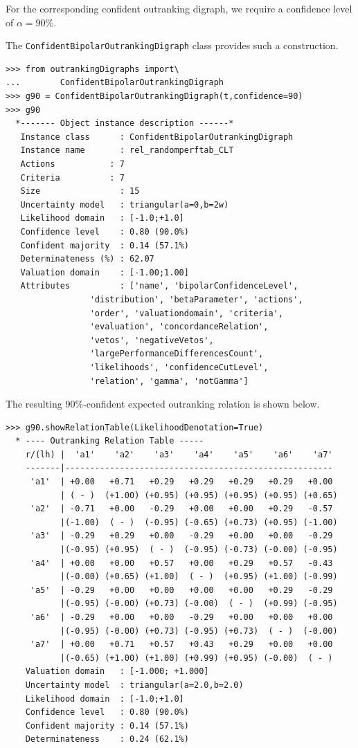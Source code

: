 For the corresponding confident outranking digraph, we require a confidence level of $\alpha = 90\%$.

The \texttt{ConfidentBipolarOutrankingDigraph} class provides such a construction.
\begin{lstlisting}
>>> from outrankingDigraphs import\
...        ConfidentBipolarOutrankingDigraph   
>>> g90 = ConfidentBipolarOutrankingDigraph(t,confidence=90)
>>> g90
  *------- Object instance description ------*
   Instance class      : ConfidentBipolarOutrankingDigraph
   Instance name       : rel_randomperftab_CLT
   Actions           : 7
   Criteria          : 7
   Size                : 15
   Uncertainty model   : triangular(a=0,b=2w)
   Likelihood domain   : [-1.0;+1.0]
   Confidence level    : 0.80 (90.0%)
   Confident majority  : 0.14 (57.1%)
   Determinateness (%) : 62.07
   Valuation domain    : [-1.00;1.00]
   Attributes          : ['name', 'bipolarConfidenceLevel',
                 'distribution', 'betaParameter', 'actions',
                 'order', 'valuationdomain', 'criteria',
                 'evaluation', 'concordanceRelation',
                 'vetos', 'negativeVetos',
                 'largePerformanceDifferencesCount',
                 'likelihoods', 'confidenceCutLevel',
                 'relation', 'gamma', 'notGamma']
\end{lstlisting}

The resulting $90\%$-confident expected outranking relation is shown below.
\begin{lstlisting}[basicstyle=\scriptsize]
>>> g90.showRelationTable(LikelihoodDenotation=True)
  * ---- Outranking Relation Table -----
    r/(lh) |  'a1'    'a2'    'a3'    'a4'    'a5'    'a6'    'a7'	 
    -------|------------------------------------------------------
     'a1'  | +0.00   +0.71   +0.29   +0.29   +0.29   +0.29   +0.00  
           | ( - )  (+1.00) (+0.95) (+0.95) (+0.95) (+0.95) (+0.65) 
     'a2'  | -0.71   +0.00   -0.29   +0.00   +0.00   +0.29   -0.57  
           |(-1.00)  ( - )  (-0.95) (-0.65) (+0.73) (+0.95) (-1.00) 
     'a3'  | -0.29   +0.29   +0.00   -0.29   +0.00   +0.00   -0.29  
           |(-0.95) (+0.95)  ( - )  (-0.95) (-0.73) (-0.00) (-0.95) 
     'a4'  | +0.00   +0.00   +0.57   +0.00   +0.29   +0.57   -0.43  
       	   |(-0.00) (+0.65) (+1.00)  ( - )  (+0.95) (+1.00) (-0.99) 
     'a5'  | -0.29   +0.00   +0.00   +0.00   +0.00   +0.29   -0.29  
           |(-0.95) (-0.00) (+0.73) (-0.00)  ( - )  (+0.99) (-0.95) 
     'a6'  | -0.29   +0.00   +0.00   -0.29   +0.00   +0.00   +0.00  
           |(-0.95) (-0.00) (+0.73) (-0.95) (+0.73)  ( - )  (-0.00) 
     'a7'  | +0.00   +0.71   +0.57   +0.43   +0.29   +0.00   +0.00  
           |(-0.65) (+1.00) (+1.00) (+0.99) (+0.95) (-0.00)  ( - )  
    Valuation domain   : [-1.000; +1.000] 
    Uncertainty model  : triangular(a=2.0,b=2.0) 
    Likelihood domain  : [-1.0;+1.0] 
    Confidence level   : 0.80 (90.0%) 
    Confident majority : 0.14 (57.1%) 
    Determinateness    : 0.24 (62.1%)
\end{lstlisting}


